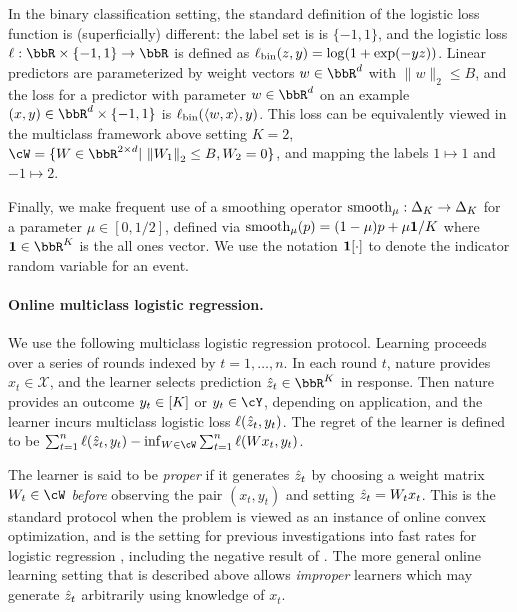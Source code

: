 In the binary classification setting, the standard definition of the logistic loss function is (superficially) different: the label set is is $\{-1, 1\}$, and the logistic loss $\ls: \R \times \{-1, 1\} \rightarrow \R$ is defined as $\ell_\text{bin}(z, y) = \log(1 + \exp(-yz))$. Linear predictors are parameterized by weight vectors $w \in \R^d$ with $\|w\|_2 \leq B$, and the loss for a predictor with parameter $w \in \R^d$ on an example $(x, y) \in \R^d \times \{-1, 1\}$ is $\ell_\text{bin}(\langle w, x\rangle, y)$. This loss can be equivalently viewed in the multiclass framework above setting $K = 2$, $\cW = \{W \in \R^{2 \times d}|\ \nrm*{W_1}_2 \leq B, W_2 = 0\}$, and mapping the labels $1 \mapsto 1$ and $-1 \mapsto 2$.

Finally, we make frequent use of a smoothing operator $\mathrm{smooth}_{\mu}: \Delta_K \rightarrow \Delta_K$ for a parameter $\mu \in [0, 1/2]$, defined via $\mathrm{smooth}_{\mu}(p) = (1-\mu)p + \mu\boldsymbol{1}{}/K$ where $\ones \in \R^K$ is the all ones vector. We use the notation $\boldsymbol{1}[\cdot]$ to denote the indicator random variable for an event.

\paragraph{Online multiclass logistic regression.} We use the following multiclass logistic regression protocol. Learning proceeds over a series of rounds indexed by $t=1,\ldots,n$. In each round $t$, nature provides $x_{t}\in\mathcal{X}$, and the learner selects prediction $\zh_{t}\in\bbR^{K}$ in response. Then nature provides an outcome $y_t \in [K]$ or $y_t\in\cY$, depending on application, and the learner incurs multiclass logistic loss $\ell(\hat{z}_t, y_t)$. The regret of the learner is defined to be $\sum_{t=1}^n \ell(\zh_t, y_t) - \inf_{W \in \cW} \sum_{t=1}^n \ell(Wx_t, y_t)$.

The learner is said to be \emph{proper} if it generates $\hat{z}_t$ by choosing a weight matrix $W_t \in \cW$ \emph{before} observing the pair $(x_t, y_t)$ and setting $\hat{z}_t = W_tx_t$. This is the standard protocol when the problem is viewed as an instance of online convex optimization, and is the setting for previous investigations into fast rates for logistic regression \citep{bach2010self,mcmahan2012open,bach2013non, bach2014adaptivity}, including the negative result of \citet{hazan2014logistic}. The more general online learning setting that is described above allows \emph{improper} learners which may generate $\hat{z}_t$ arbitrarily using knowledge of $x_t$. 

